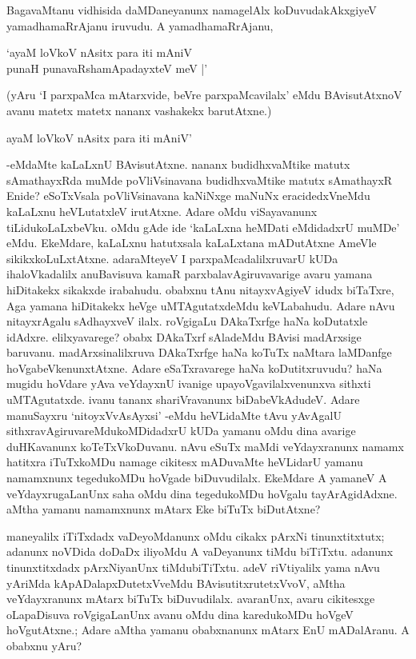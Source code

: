 BagavaMtanu vidhisida daMDaneyanunx namagelAlx koDuvudakAkxgiyeV yamadhamaRrAjanu iruvudu. A yamadhamaRrAjanu,

\begin{shloka}
`ayaM loVkoV nAsitx para iti mAniV\\
punaH punavaRshamApadayxteV meV |'
\end{shloka}

(yAru `I parxpaMca mAtarxvide, beVre parxpaMcavilalx' eMdu BAvisutAtxnoV avanu matetx matetx nananx vashakekx barutAtxne.)

\begin{shloka}
ayaM loVkoV nAsitx para iti mAniV'
\end{shloka}

-eMdaMte kaLaLxnU BAvisutAtxne. nananx budidhxvaMtike matutx sAmathayxRda muMde poVliVsinavana budidhxvaMtike matutx sAmathayxR Enide? eSoTxVsala poVliVsinavana kaNiNxge maNuNx eracidedxVneMdu kaLaLxnu heVLutatxleV irutAtxne. Adare oMdu viSayavanunx tiLidukoLaLxbeVku. oMdu gAde ide `kaLaLxna heMDati eMdidadxrU muMDe' eMdu. EkeMdare, kaLaLxnu hatutxsala kaLaLxtana mADutAtxne AmeVle sikikxkoLuLxtAtxne. adaraMteyeV I parxpaMcadalilxruvarU kUDa ihaloVkadalilx anuBavisuva kamaR parxbalavAgiruvavarige avaru yamana hiDitakekx sikakxde irabahudu. obabxnu tAnu nitayxvAgiyeV idudx biTaTxre, Aga yamana hiDitakekx heVge uMTAgutatxdeMdu keVLabahudu. Adare nAvu nitayxrAgalu sAdhayxveV ilalx. roVgigaLu DAkaTxrfge haNa koDutatxle idAdxre. elilxyavarege? obabx DAkaTxrf sAladeMdu BAvisi madArxsige baruvanu. madArxsinalilxruva DAkaTxrfge haNa koTuTx naMtara laMDanfge hoVgabeVkenunxtAtxne. Adare eSaTxravarege haNa koDutitxruvudu? haNa mugidu hoVdare yAva veYdayxnU ivanige upayoVgavilalxvenunxva sithxti uMTAgutatxde. ivanu tananx shariVravanunx biDabeVkAdudeV. Adare manuSayxru `nitoyxVvAsAyxsi' -eMdu heVLidaMte tAvu yAvAgalU sithxravAgiruvareMdukoMDidadxrU kUDa yamanu oMdu dina avarige duHKavanunx koTeTxVkoDuvanu. nAvu eSuTx maMdi veYdayxranunx namamx hatitxra iTuTxkoMDu namage cikitesx mADuvaMte heVLidarU yamanu namamxnunx tegedukoMDu hoVgade biDuvudilalx. EkeMdare A yamaneV A veYdayxrugaLanUnx saha oMdu dina tegedukoMDu hoVgalu tayArAgidAdxne. aMtha yamanu namamxnunx mAtarx Eke biTuTx biDutAtxne?

maneyalilx iTiTxdadx vaDeyoMdanunx oMdu cikakx pArxNi tinunxtitxtutx; adanunx noVDida doDaDx iliyoMdu A vaDeyanunx tiMdu biTiTxtu. adanunx tinunxtitxdadx pArxNiyanUnx tiMdubiTiTxtu. adeV riVtiyalilx yama nAvu yAriMda kApADalapxDutetxVveMdu BAvisutitxrutetxVvoV, aMtha veYdayxranunx mAtarx biTuTx biDuvudilalx. avaranUnx, avaru cikitesxge oLapaDisuva roVgigaLanUnx avanu oMdu dina karedukoMDu hoVgeV hoVgutAtxne.; Adare aMtha yamanu obabxnanunx mAtarx EnU mADalAranu. A obabxnu yAru?

